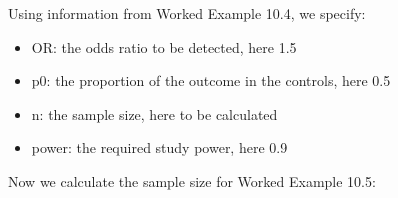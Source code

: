 \documentclass[
]{memoir}
\newenvironment{Shaded}{\begin{snugshade}}{\end{snugshade}}
\newcommand{\AttributeTok}[1]{\textcolor[rgb]{0.77,0.63,0.00}{#1}}
\newcommand{\CommentTok}[1]{\textcolor[rgb]{0.56,0.35,0.01}{\textit{#1}}}
\newcommand{\ConstantTok}[1]{\textcolor[rgb]{0.00,0.00,0.00}{#1}}
\newcommand{\DecValTok}[1]{\textcolor[rgb]{0.00,0.00,0.81}{#1}}
\newcommand{\FloatTok}[1]{\textcolor[rgb]{0.00,0.00,0.81}{#1}}
\newcommand{\FunctionTok}[1]{\textcolor[rgb]{0.00,0.00,0.00}{#1}}
\newcommand{\NormalTok}[1]{#1}
\providecommand{\tightlist}{%
  \setlength{\itemsep}{0pt}\setlength{\parskip}{0pt}}
\begin{document}
Using information from Worked Example 10.4, we specify:

\begin{itemize}
\tightlist
\item
  OR: the odds ratio to be detected, here 1.5
\item
  p0: the proportion of the outcome in the controls, here 0.5
\item
  n: the sample size, here to be calculated
\item
  power: the required study power, here 0.9
\end{itemize}

\begin{Shaded}
\end{Shaded}

Now we calculate the sample size for Worked Example 10.5:

\begin{Shaded}
\end{Shaded}
\end{document}
